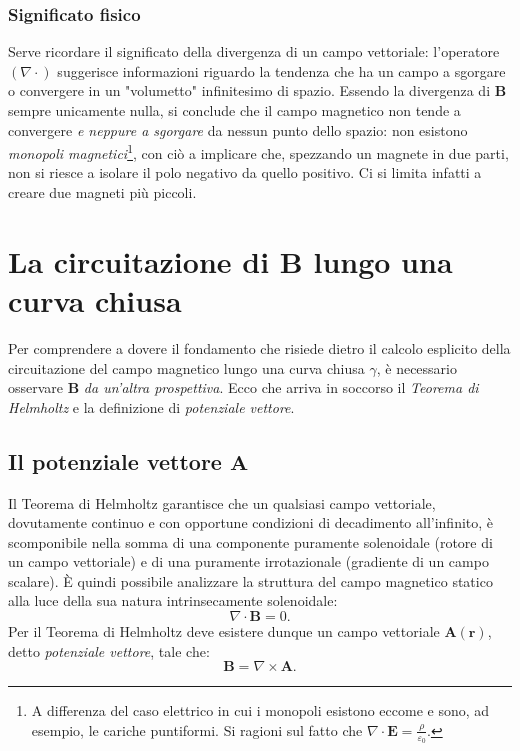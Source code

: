 \documentclass[a4paper,11pt]{report}
\begin{document}
\subsubsection{Significato fisico}
Serve ricordare il significato della divergenza di un campo vettoriale: l'operatore $(\nabla \cdot )$ suggerisce informazioni riguardo la tendenza che ha un campo a sgorgare o convergere in un "volumetto" infinitesimo di spazio. Essendo la divergenza di $\bm{B}$ sempre unicamente nulla, si conclude che il campo magnetico non tende a convergere \textit{e neppure a sgorgare} da nessun punto dello spazio: non esistono \textit{monopoli magnetici}\footnote{A differenza del caso elettrico in cui i monopoli esistono eccome e sono, ad esempio, le cariche puntiformi. Si ragioni sul fatto che $\nabla \cdot \bm{E} = \frac{\rho}{\varepsilon_0}$.}, con ciò a implicare che, spezzando un magnete in due parti, non si riesce a isolare il polo negativo da quello positivo. Ci si limita infatti a creare due magneti più piccoli.

\section{La circuitazione di \texorpdfstring{$\bm{B}$}{campo magnetico} lungo una curva chiusa}
Per comprendere a dovere il fondamento che risiede dietro il calcolo esplicito della circuitazione del campo magnetico lungo una curva chiusa $\gamma$, è necessario osservare $\bm{B}$ \textit{da un'altra prospettiva}. Ecco che arriva in soccorso il \textit{Teorema di Helmholtz} e la definizione di \textit{potenziale vettore}.




\subsection{Il potenziale vettore \texorpdfstring{$\bm{A}$}{A}}
Il Teorema di Helmholtz garantisce che un qualsiasi campo vettoriale, dovutamente continuo e con opportune condizioni di decadimento all'infinito, è scomponibile nella somma di una componente puramente solenoidale (rotore di un campo vettoriale) e di una puramente irrotazionale (gradiente di un campo scalare). È quindi possibile analizzare la struttura del campo magnetico statico alla luce della sua natura intrinsecamente solenoidale:
\begin{equation}
    \nabla \cdot \bm{B} = 0.
\end{equation}
Per il Teorema di Helmholtz deve esistere dunque un campo vettoriale $\bm{A}(\bm{r})$, detto \textit{potenziale vettore}, tale che:
\begin{equation}
    \bm{B} = \nabla \times \bm{A}.
    \label{eq:def_potenziale_vettore}
\end{equation} 
\end{document}
